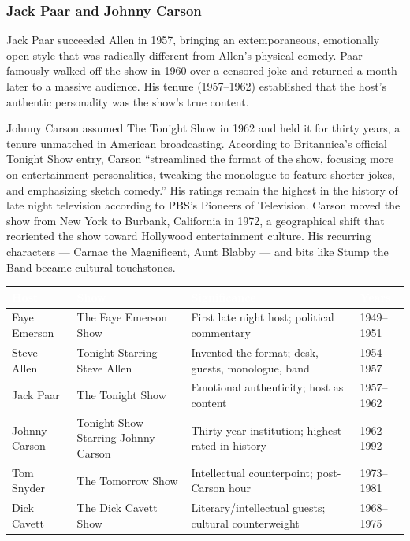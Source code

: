 \documentclass[11pt,letterpaper]{article}
\newcommand{\tableheader}[1]{\textbf{\sffamily\textcolor{white}{#1}}}
\begin{document}
\subsubsection{Jack Paar and Johnny Carson}
Jack Paar succeeded Allen in 1957, bringing an extemporaneous, emotionally open style that was radically different from Allen's physical comedy. Paar famously walked off the show in 1960 over a censored joke and returned a month later to a massive audience. His tenure (1957--1962) established that the host's authentic personality was the show's true content.

Johnny Carson assumed The Tonight Show in 1962 and held it for thirty years, a tenure unmatched in American broadcasting. According to Britannica's official Tonight Show entry, Carson ``streamlined the format of the show, focusing more on entertainment personalities, tweaking the monologue to feature shorter jokes, and emphasizing sketch comedy.'' His ratings remain the highest in the history of late night television according to PBS's Pioneers of Television. Carson moved the show from New York to Burbank, California in 1972, a geographical shift that reoriented the show toward Hollywood entertainment culture. His recurring characters --- Carnac the Magnificent, Aunt Blabby --- and bits like Stump the Band became cultural touchstones.

\begin{center}
\begin{tabularx}{\textwidth}{L{2.5cm}L{3cm}XC{1.5cm}}
\toprule
{}
\tableheader{Host} & \tableheader{Show} & \tableheader{Significance} & \tableheader{Years} \\
\midrule
Faye Emerson & The Faye Emerson Show & First late night host; political commentary & 1949--1951 \\
Steve Allen & Tonight Starring Steve Allen & Invented the format; desk, guests, monologue, band & 1954--1957 \\
Jack Paar & The Tonight Show & Emotional authenticity; host as content & 1957--1962 \\
Johnny Carson & Tonight Show Starring Johnny Carson & Thirty-year institution; highest-rated in history & 1962--1992 \\
Tom Snyder & The Tomorrow Show & Intellectual counterpoint; post-Carson hour & 1973--1981 \\
Dick Cavett & The Dick Cavett Show & Literary/intellectual guests; cultural counterweight & 1968--1975 \\
\bottomrule
\end{tabularx}
\end{center}
\end{document}
